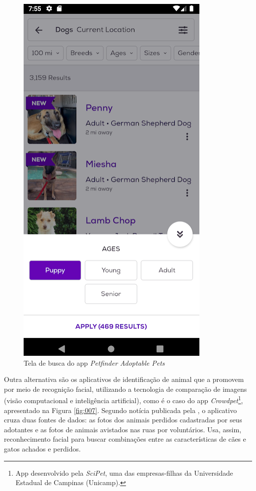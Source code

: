 \documentclass[portuguese]{textolivre}
\begin{document}
\begin{figure}
	\centering
	\includegraphics[scale=0.80]{imagens/fig-005.png}
	\caption{Tela de busca do app \textit{Petfinder Adoptable Pets}}
	\label{fig:005}
\end{figure} 

Outra alternativa são os aplicativos de identificação de animal que a promovem por meio de recognição facial, utilizando a tecnologia de comparação de imagens (visão computacional e inteligência artificial), como é o caso do app \textit{Crowdpet}\footnote{App desenvolvido pela \textit{SciPet}, uma das empresas-filhas da Universidade Estadual de Campinas (Unicamp).}, apresentado na Figura \ref{fig:007}.  Segundo notícia publicada pela \textcite{FAPESP:2017}, o aplicativo cruza duas fontes de dados: as fotos dos animais perdidos cadastradas por seus adotantes e as fotos de animais avistados nas ruas por voluntários. Usa, assim, reconhecimento facial para buscar combinações entre as características de cães e gatos achados e perdidos.
\end{document}
